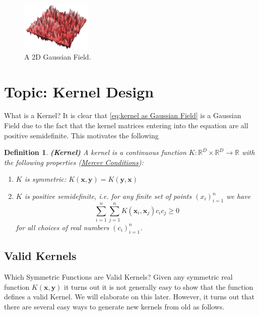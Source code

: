 \documentclass[11pt]{article}
\theoremstyle{plain} %
\newtheorem{definition}[theorem]{Definition}
\theoremstyle{remark}
\begin{document}
\begin{figure}[!htp]
  \centering
  \includegraphics[width=0.3\textwidth]{images/2023_11_26_5b299dbd302e8f129737g-22}
  \caption{A 2D Gaussian Field.}
  \label{fig:2D Gaussian Field}
\end{figure}

\section{Topic:  Kernel Design}

What is a Kernel? It is clear that \cref{eq:kernel as Gaussian Field} is a Gaussian Field due to the fact that
the kernel matrices entering into the equation are all positive semidefinite.
This motivates the following

\begin{definition}
  \textbf{(Kernel)} A kernel is a continuous function $K: \mathbb{R}^{D} \times \mathbb{R}^{D}
    \rightarrow \mathbb{R}$ with the following properties (\href{https://en.wikipedia.org/wiki/Mercer%27s_theorem}{Mercer Conditions}):
  \begin{enumerate}
    \item $K$ is symmetric: $K(\mathbf{x}, \mathbf{y})=K(\mathbf{y}, \mathbf{x})$
    \item $K$ is positive semidefinite, i.e. for any finite set of points
          $\left(x_{i}\right)_{i=1}^{n}$ we have
          $$
            \sum_{i=1}^{n} \sum_{j=1}^{n} K\left(\mathbf{x}_{i}, \mathbf{x}_{j}\right) c_{i} c_{j} \geq 0
          $$
          for all choices of real numbers $\left(c_{i}\right)_{i=1}^{n}$.
  \end{enumerate}
\end{definition}

\subsection{Valid Kernels}
Which Symmetric Functions are Valid Kernels? Given any symmetric real function
$K(\mathbf{x}, \mathbf{y})$ it turns out it is not generally easy to show that
the function defines a valid Kernel. We will elaborate on this later. However,
it turns out that there are several easy ways to generate new kernels from old
as follows.
\end{document}
